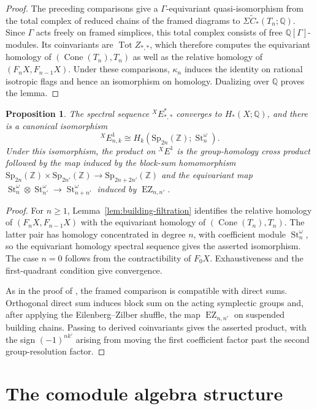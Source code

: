 \documentclass[12 pt]{amsart}
\newcommand{\QQ}{\mathbb{Q}}
\newcommand{\ZZ}{\mathbb{Z}}
\newcommand{\EX}{{}^{X}\!E}
\newcommand{\Sp}{\mathrm{Sp}}
\newcommand{\St}{\operatorname{St}}
\newcommand{\Cone}{\operatorname{Cone}}
\newcommand{\Tot}{\operatorname{Tot}}
\newcommand{\<}{\langle}
\renewcommand{\>}{\rangle}
\newtheorem{proposition}[theorem]{Proposition}
\theoremstyle{definition}
\begin{document}
\begin{proof}
The preceding comparisons give a $\Gamma$-equivariant quasi-isomorphism from the total complex of reduced chains of the framed diagrams to $\Sigma \widetilde C_*(T_n; \QQ)$. Since $\Gamma$ acts freely on framed simplices, this total complex consists of free $\mathbb Q[\Gamma]$-modules. Its coinvariants are $\Tot Z_{*, *}$, which therefore computes the equivariant homology of $(\operatorname{Cone}(T_n), T_n)$ as well as the relative homology of $(F_n X, F_{n-1} X)$. Under these comparisons, $\kappa_n$ induces the identity on rational isotropic flags and hence an isomorphism on homology. Dualizing over $\QQ$ proves the lemma.
\end{proof}

\begin{proposition}\label{prop:E1X}
The spectral sequence $\EX^*_{*, *}$ converges to $H_*(X; \QQ)$, and there is a canonical isomorphism
\[
\EX^1_{n, k} \cong H_k(\Sp_{2n}(\ZZ); \St^\omega_n).
\]
Under this isomorphism, the product on $\EX^1$ is the group-homology cross product followed by the map induced by the block-sum homomorphism $\Sp_{2n}(\ZZ) \times \Sp_{2n'}(\ZZ) \to \Sp_{2n + 2n'}(\ZZ)$ and the equivariant map $\St_n^\omega \otimes \St_{n'}^\omega \longrightarrow \St_{n + n'}^\omega$ induced by $\operatorname{EZ}_{n, n'}$.
\end{proposition}

\begin{proof}
For $n \geq 1$, Lemma~\ref{lem:building-filtration} identifies the relative homology of $(F_n X, F_{n - 1} X)$ with the equivariant homology of $(\Cone(T_n), T_n)$. The latter pair has homology concentrated in degree $n$, with coefficient module $\St_n^\omega$, so the equivariant homology spectral sequence gives the asserted isomorphism. The case $n = 0$ follows from the contractibility of $F_0 X$. Exhaustiveness and the first-quadrant condition give convergence.

As in the proof of \cite[Proposition~2.15]{BCGP}, the framed comparison is compatible with direct sums. Orthogonal direct sum induces block sum on the acting symplectic groups and, after applying the Eilenberg--Zilber shuffle, the map $\operatorname{EZ}_{n, n'}$ on suspended building chains. Passing to derived coinvariants gives the asserted product, with the sign $(-1)^{nk'}$ arising from moving the first coefficient factor past the second group-resolution factor.
\end{proof}


\section{The comodule algebra structure}\label{sec:comod}
\end{document}
